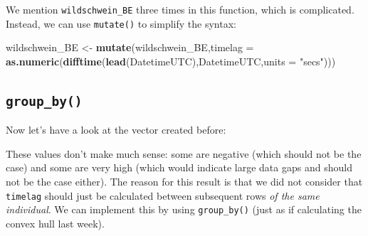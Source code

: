 \documentclass[]{book}
\newenvironment{Shaded}{\begin{snugshade}}{\end{snugshade}}
\newcommand{\CommentTok}[1]{\textcolor[rgb]{0.56,0.35,0.01}{\textit{#1}}}
\newcommand{\DataTypeTok}[1]{\textcolor[rgb]{0.13,0.29,0.53}{#1}}
\newcommand{\KeywordTok}[1]{\textcolor[rgb]{0.13,0.29,0.53}{\textbf{#1}}}
\newcommand{\NormalTok}[1]{#1}
\newcommand{\OperatorTok}[1]{\textcolor[rgb]{0.81,0.36,0.00}{\textbf{#1}}}
\newcommand{\StringTok}[1]{\textcolor[rgb]{0.31,0.60,0.02}{#1}}
\begin{document}
\begin{Shaded}
\end{Shaded}

We mention \texttt{wildschwein\_BE} three times in this function, which is complicated. Instead, we can use \texttt{mutate()} to simplify the syntax:

\begin{Shaded}
\begin{Highlighting}[]
\NormalTok{wildschwein_BE <-}\StringTok{ }\KeywordTok{mutate}\NormalTok{(wildschwein_BE,}\DataTypeTok{timelag =} \KeywordTok{as.numeric}\NormalTok{(}\KeywordTok{difftime}\NormalTok{(}\KeywordTok{lead}\NormalTok{(DatetimeUTC),DatetimeUTC,}\DataTypeTok{units =} \StringTok{"secs"}\NormalTok{)))}
\end{Highlighting}
\end{Shaded}

\hypertarget{group_by}{%
\subsection{\texorpdfstring{\texttt{group\_by()}}{group\_by()}}\label{group_by}}

Now let's have a look at the vector created before:

\begin{Shaded}
\end{Shaded}

These values don't make much sense: some are negative (which should not be the case) and some are very high (which would indicate large data gaps and should not be the case either). The reason for this result is that we did not consider that \texttt{timelag} should just be calculated between subsequent rows \emph{of the same individual}. We can implement this by using \texttt{group\_by()} (just as if calculating the convex hull last week).
\end{document}

